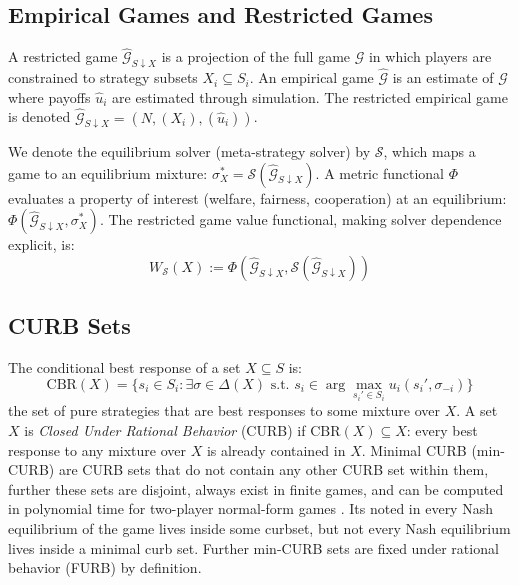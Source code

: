 \documentclass[sigconf,anonymous]{aamas}
\begin{document}
\subsection{Empirical Games and Restricted Games}
A restricted game $\hat{\mathcal{G}}_{S \downarrow X}$ is a projection of the full game $\mathcal{G}$ in which players are constrained to strategy
subsets $X_i \subseteq S_i$. An empirical game $\hat{\mathcal{G}}$ is an estimate of $\mathcal{G}$ where payoffs $\hat{u}_i$ are estimated through
simulation. The restricted empirical game is denoted $\hat{\mathcal{G}}_{S \downarrow X} = (N, (X_i), (\hat{u}_i))$.

We denote the equilibrium solver (meta-strategy solver) by $\mathcal{S}$, which maps a game to an equilibrium mixture: $\sigma^*_X = \mathcal{S}(\hat{\mathcal{G}}_{S \downarrow X})$. A metric functional $\Phi$ evaluates a property of interest (welfare, fairness, cooperation) at an
equilibrium: $\Phi(\hat{\mathcal{G}}_{S \downarrow X}, \sigma^*_X)$. The restricted game value functional, making solver dependence explicit, is:
\begin{equation}
  W_{\mathcal{S}}(X) := \Phi(\hat{\mathcal{G}}_{S \downarrow X}, \mathcal{S}(\hat{\mathcal{G}}_{S \downarrow X}))
\end{equation}

\subsection{CURB Sets}

The conditional best response of a set $X \subseteq S$ is:
\begin{equation}
  \text{CBR}(X) = \{s_i \in S_i : \exists \sigma \in \Delta(X) \text{ s.t. } s_i \in \arg\max_{s_i' \in S_i} u_i(s_i', \sigma_{-i})\}
\end{equation}
the set of pure strategies that are best responses to some mixture over $X$. A set $X$ is \textit{Closed Under Rational Behavior} (CURB)
\citep{Basu1991StrategySC} if $\text{CBR}(X) \subseteq X$: every best response to any mixture over $X$ is already contained in $X$.  Minimal CURB (min-CURB) are CURB sets that do not contain any other CURB set within them, further these sets are disjoint, always exist in finite games, and can be computed in polynomial time for two-player normal-form games \citep{Benisch2010AlgorithmsFC, Klimm2009FindingAM}.  Its noted in \citep{Basu1991StrategySC} every Nash equilibrium of the game lives inside some curbset, but not every Nash equilibrium lives inside a minimal curb set. Further min-CURB sets are fixed under rational behavior (FURB) by definition.
\end{document}
